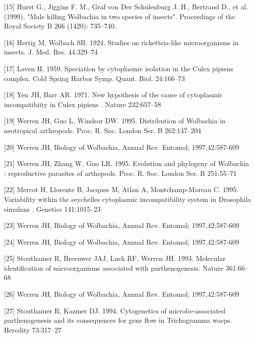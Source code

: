 \documentclass[twocolumn]{article}
\begin{document}
[15] Hurst G., Jiggins F. M., Graf von Der Schulenburg J. H., Bertrand D., et al. (1999). "Male killing Wolbachia in two species of insects". Proceedings of the Royal Society B 266 (1420): 735–740.  

[16] Hertig M, Wolbach SB. 1924. Studies on rickettsia-like microorganisms in insects. J. Med. Res. 44:329–74

[17] Laven H. 1959. Speciation by cytoplasmic isolation in the Culex pipiens complex. Cold Spring Harbor Symp. Quant. Biol. 24:166–73

[18] Yen JH, Barr AR. 1971. New hypothesis of the cause of cytoplasmic incompatibiity in Culex pipiens . Nature 232:657–58

[19] Werren JH, Guo L, Windsor DW. 1995. Distribution of Wolbachia in neotropical arthropods. Proc. R. Soc. London Ser. B 262:147–204

[20] Werren JH, Biology of Wolbachia, Annual Rev. Entomol; 1997,42:587-609

[21] Werren JH, Zhang W, Guo LR. 1995. Evolution and phylogeny of Wolbachia : reproductive parasites of arthopods. Proc. R. Soc. London Ser. B 251:55–71 

[22] Mercot H, Llorente B, Jacques M, Atlan A, Montchamp-Moreau C. 1995. Variability within the seychelles cytoplasmic incompatibility system in Drosophila simulans . Genetics 141:1015–23

[23] Werren JH, Biology of Wolbachia, Annual Rev. Entomol; 1997,42:587-609

[24] Werren JH, Biology of Wolbachia, Annual Rev. Entomol; 1997,42:587-609

[25] Stouthamer R, Breeuwer JAJ, Luck RF, Werren JH. 1993. Molecular identification of microorganisms associated with parthenogenesis. Nature 361:66–68

[26] Werren JH, Biology of Wolbachia, Annual Rev. Entomol; 1997,42:587-609

[27] Stouthamer R, Kazmer DJ. 1994. Cytogenetics of microbe-associated parthenogenesis and its consequences for gene flow in Trichogramma wasps. Heredity 73:317–27 
\end{document}
